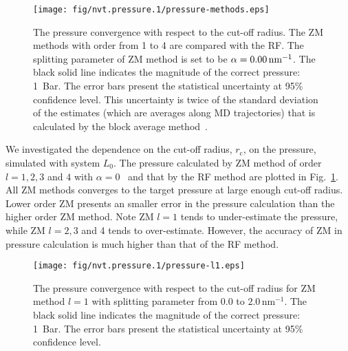 \documentclass[a4paper,preprint,unsortedaddress,onecolumn,fleqn]{revtex4}
\begin{document}
\begin{figure}[tbp]
\centering
\texttt{[image: fig/nvt.pressure.1/pressure-methods.eps]}
\caption{The pressure convergence with respect to the cut-off radius. The ZM
methods with order from 1 to 4 are compared with the RF. The splitting
parameter of ZM method is set to be $\protect\alpha =0.00\,\text{nm}^{-1}$.
The black solid line indicates the magnitude of the correct pressure: 1~Bar.
The error bars present the statistical uncertainty at 95\% confidence level. 
{\color{red} This uncertainty is twice of the standard deviation of the
estimates (which are averages along MD trajectories) that is calculated by
the block average method~\protect\cite{janke2002statistical}.}
}
\label{fig:pres-comp}
\end{figure}

We investigated the dependence on the cut-off radius, $r_{\text{c}}$, on the
pressure, simulated with system $L_{0}$. The pressure calculated by ZM
method of order $l=1,2,3$ and $4$ with $\alpha =0$ \ and that by the RF
method are plotted in Fig.~\ref{fig:pres-comp}. All ZM methods converges to
the target pressure at large enough cut-off radius. Lower order ZM presents
an smaller error in the pressure calculation than the higher order ZM
method. Note ZM $l=1$ tends to under-estimate the pressure, while ZM $l=2,3$
and 4 tends to over-estimate. However, the accuracy of ZM in pressure
calculation is much higher than that of the RF method.

\begin{figure}[tbp]
\centering
\texttt{[image: fig/nvt.pressure.1/pressure-l1.eps]} %
\caption{ The pressure convergence with respect to the cut-off radius for ZM
method $l=1$ with splitting parameter from $0.0$ to $2.0\,\text{nm}^{-1}$.
The black solid line indicates the magnitude of the correct pressure: 1~Bar.
The error bars present the statistical uncertainty at 95\% confidence level.}
\label{fig:pres-l1}
\end{figure}
\end{document}
